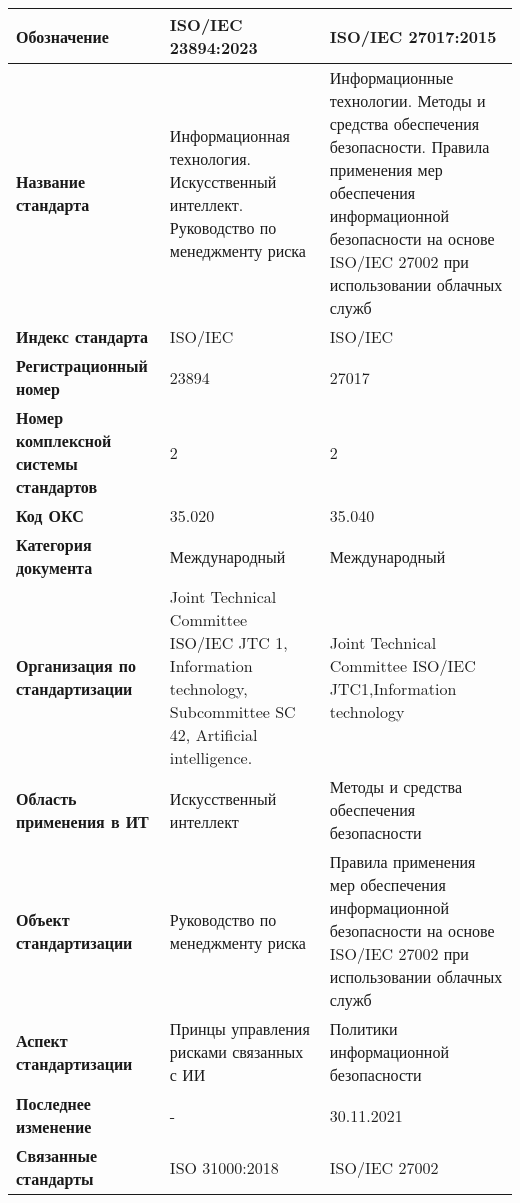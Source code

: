 \begin{table}[h!tp]
	\centering
	\caption{}
	\label{table:international}
	\begin{tabular}{|p{10em}|p{12em}|p{12em}|}
		\hline
		\textbf{Обозначение}
			& \textbf{ISO/IEC 23894:2023} & \textbf{ISO/IEC 27017:2015} \\ \hline
		\textbf{Название стандарта}
				& Информационная технология. Искусственный интеллект. Руководство по менеджменту риска
				& Информационные технологии. Методы и средства обеспечения безопасности. Правила применения мер обеспечения информационной безопасности на основе ISO/IEC 27002 при использовании облачных служб \\ \hline
		\textbf{Индекс стандарта}
			& ISO/IEC & ISO/IEC \\ \hline
		\textbf{Регистрационный номер}
			& 23894 & 27017 \\ \hline
		\textbf{Номер комплексной системы стандартов}
			& 2 & 2 \\ \hline
		\textbf{Код ОКС}
			& 35.020 & 35.040 \\ \hline
		\textbf{Категория документа}
			& Международный & Международный \\ \hline
		\textbf{Организация по стандартизации}
			& Joint Technical Committee ISO/IEC JTC 1, Information technology, Subcommittee SC 42, Artificial intelligence. & Joint Technical Committee ISO/IEC JTC1,Information technology \\ \hline
		\textbf{Область применения в ИТ}
			& Искусственный интеллект & Методы и средства обеспечения безопасности \\ \hline
		\textbf{Объект стандартизации}
			& Руководство по менеджменту риска
			&  Правила применения мер обеспечения информационной безопасности на основе ISO/IEC 27002 при использовании облачных служб \\ \hline
		\textbf{Аспект стандартизации}
			& Принцы управления рисками связанных с  ИИ
			& Политики информационной безопасности \\ \hline
		\textbf{Последнее изменение} & - & 30.11.2021 \\ \hline
		\textbf{Связанные стандарты} & ISO 31000:2018 & ISO/IEC 27002 \\ \hline
	\end{tabular}
\end{table}

